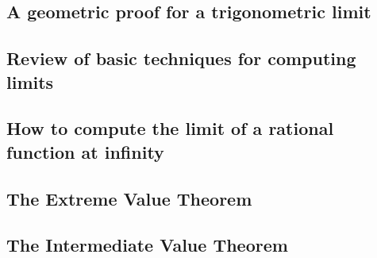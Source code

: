 \subsection{A geometric proof for a trigonometric limit}
\subsection{Review of basic techniques for computing limits}
\subsection{How to compute the limit of a rational function at infinity}
\subsection{The Extreme Value Theorem}
\subsection{The Intermediate Value Theorem}
